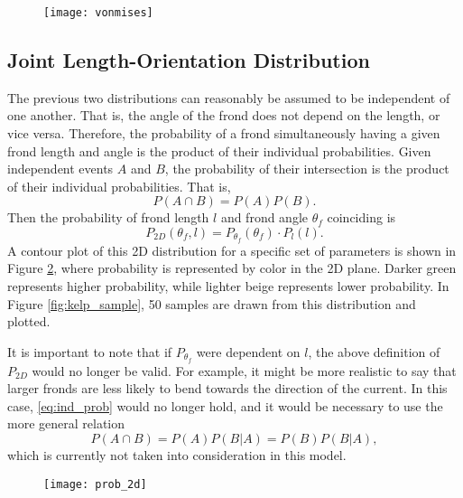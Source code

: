 \begin{figure}[h]
	\centering
	\texttt{[image: vonmises]}
	\label{fig:vonmises}
\end{figure}

\subsection{Joint Length-Orientation Distribution}
\label{sec:dist_2d}
The previous two distributions can reasonably be assumed to be independent of one another. That is, the angle of the frond does not depend on the length, or vice versa.
Therefore, the probability of a frond simultaneously having a given frond length and angle is the product of their individual probabilities.
Given independent events $A$ and $B$, the probability of their intersection is the product of their individual probabilities.
That is,
\begin{equation*}
	\label{eq:ind_prob}
	P(A \cap B) = P(A)P(B).
\end{equation*}
Then the probability of frond length $l$ and frond angle $\theta_f$ coinciding is
\begin{equation*}
	P_{2D}(\theta_f,l) = P_{\theta_f}(\theta_f) \cdot P_l(l).
\end{equation*}
A contour plot of this 2D distribution for a specific set of parameters is shown in Figure \ref{fig:dist_2d}, where probability is represented by color in the 2D plane.
Darker green represents higher probability, while lighter beige represents lower probability.
In Figure \ref{fig:kelp_sample}, 50 samples are drawn from this distribution and plotted.

It is important to note that if $P_{\theta_f}$ were dependent on $l$, the above definition of $P_{2D}$ would no longer be valid.
For example, it might be more realistic to say that larger fronds are less likely to bend towards the direction of the current.
In this case, \eqref{eq:ind_prob} would no longer hold, and it would be necessary to use the more general relation
\begin{equation*}
	P(A \cap B) = P(A)P(B|A) = P(B)P(B|A),
\end{equation*}
which is currently not taken into consideration in this model.

\begin{figure}[h]
	\centering
	\texttt{[image: prob\_2d]}
	\label{fig:dist_2d}
\end{figure}

